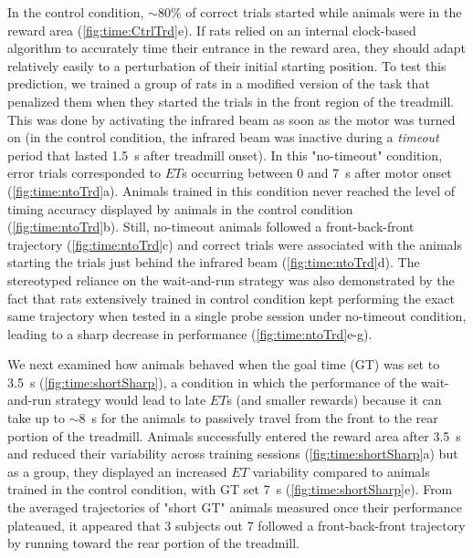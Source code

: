 \par

In the control condition, $\sim$80\% of correct trials started while animals were in the reward area (\autoref{fig:time:CtrlTrd}e).
If rats relied on an internal clock-based algorithm to accurately time their entrance in the reward area, they should adapt relatively easily to a perturbation of their initial starting position.
To test this prediction, we trained a group of rats in a modified version of the task that penalized them when they started the trials in the front region of the treadmill.
This was done by activating the infrared beam as soon as the motor was turned on (in the control condition, the infrared beam was inactive during a \textit{timeout} period that lasted 1.5~s after treadmill onset).
In this "no-timeout" condition, error trials corresponded to $ET$s occurring between 0 and 7~s after motor onset (\autoref{fig:time:ntoTrd}a).
Animals trained in this condition never reached the level of timing accuracy displayed by animals in the control condition (\autoref{fig:time:ntoTrd}b).
Still, no-timeout animals followed a front-back-front trajectory (\autoref{fig:time:ntoTrd}c) and correct trials were associated with the animals starting the trials just behind the infrared beam (\autoref{fig:time:ntoTrd}d).
The stereotyped reliance on the wait-and-run strategy was also demonstrated by the fact that rats extensively trained in control condition kept performing the exact same trajectory when tested in a single probe session under no-timeout condition, leading to a sharp decrease in performance (\autoref{fig:time:ntoTrd}e-g).
\par

We next examined how animals behaved when the goal time (GT) was set to 3.5~s (\autoref{fig:time:shortSharp}), a condition in which the performance of the wait-and-run strategy would lead to late $ET$s (and smaller rewards) because it can take up to $\sim$8~s for the animals to passively travel from the front to the rear portion of the treadmill.
Animals successfully entered the reward area after 3.5~s and reduced their variability across training sessions (\autoref{fig:time:shortSharp}a) but as a group, they displayed an increased $ET$ variability compared to animals trained in the control condition, with GT set 7~s (\autoref{fig:time:shortSharp}e).
From the averaged trajectories of "short GT" animals measured once their performance plateaued, it appeared that 3 subjects out 7 followed a front-back-front trajectory by running toward the rear portion of the treadmill.

